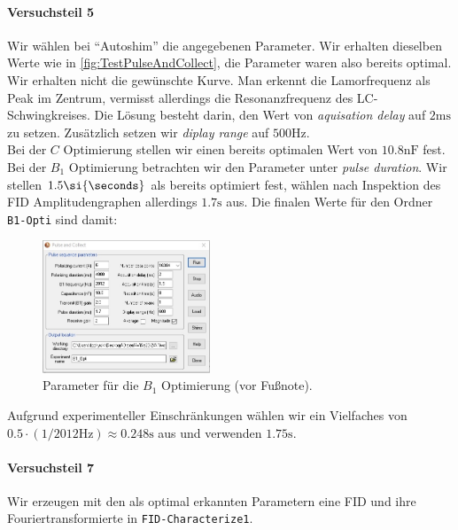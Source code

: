 \documentclass{subfiles}
\begin{document}
            
        \paragraph*{Versuchsteil 5}
            Wir wählen bei \enquote{Autoshim} die angegebenen Parameter. Wir erhalten dieselben Werte wie in \ref{fig:TestPulseAndCollect}, die Parameter waren also bereits optimal. \\

            Wir erhalten nicht die gewünschte Kurve. Man erkennt die Lamorfrequenz als Peak im Zentrum, vermisst allerdings die Resonanzfrequenz des LC-Schwingkreises. Die Lösung besteht darin, den Wert von \emph{aquisation delay} auf $2\si{\ms}$ zu setzen. Zusätzlich setzen wir \emph{diplay range} auf $500\si{\hertz}$. \\

            Bei der $C$ Optimierung stellen wir einen bereits optimalen Wert von $10.8\si{\nano\farad}$ fest. \\

            Bei der $B_1$ Optimierung betrachten wir den Parameter unter \emph{pulse duration}. Wir stellen $1.5\si{\seconds}$ als bereits optimiert fest, wählen nach Inspektion des FID Amplitudengraphen allerdings $1.7\si{\s}$ aus. Die finalen Werte für den Ordner \texttt{B1-Opti} sind damit:
            \begin{figure}[H]
                \centering
                \includegraphics[width=5cm]{Live-Dokumente/Bilder/B1OptiWerte.jpeg}
                \caption{Parameter für die $B_1$ Optimierung (vor Fußnote).}
                \label{fig:B1OptiParam}
            \end{figure}
            Aufgrund experimenteller Einschränkungen wählen wir ein Vielfaches von $0.5\cdot (1/2012\si{\hertz})\approx 0.248\si{\s}$ aus und verwenden $1.75\si\s$.  


        \paragraph*{Versuchsteil 7}
            Wir erzeugen mit den als optimal erkannten Parametern eine FID und ihre Fouriertransformierte in \texttt{FID-Characterize1}.
            
\end{document}

